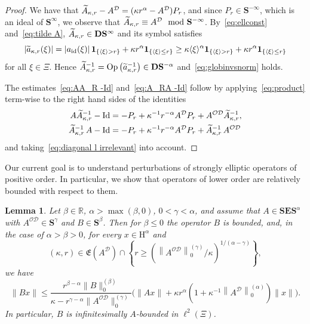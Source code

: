 \documentclass[10pt]{amsart}
\newtheorem{lemm}[theo]{Lemma}\newtheorem{prop}[theo]{Proposition}\newtheorem{coro}[theo]{Corollary}\newtheorem{conj}[theo]{Conjecture}
\theoremstyle{definition}\newtheorem{defi}[theo]{Definition}\newtheorem{rema}[theo]{Remark}\newtheorem{exam}[theo]{Example}\newtheorem{nota}[theo]{Notation}
\DeclareMathOperator{\Op}{Op}
\DeclareMathOperator{\Id}{Id}
\DeclareMathOperator{\id}{id}
\renewcommand{\mathsf}{\mathrm}
\newcommand{\sfH}{\mathsf{H}}
\newcommand{\R}{\mathbb R}
\newcommand{\CD}{\mathcal{D}}
\newcommand{\CO}{\mathcal{O}}
\newcommand{\bone}{\boldsymbol 1}
\newcommand{\BD}{\mathbf D}
\newcommand{\BE}{\mathbf E}
\newcommand{\BS}{\mathbf S}
\newcommand{\FE}{\mathfrak{E}}
\newcommand{\abs}[1]{\left\lvert #1 \right\rvert}
\newcommand{\set}[1]{\left\{ #1 \right\}}
\newcommand{\ang}[1]{\langle #1 \rangle}
\newcommand{\er}{r}
\let\oldtilde\tilde
\renewcommand*{\tilde}[1]{\mathchoice{\widetilde{#1}}{\widetilde{#1}}{\oldtilde{#1}}{\oldtilde{#1}}}
\begin{document}
\begin{proof}
We have that $\tilde A_{\kappa,\er} - A^{\CD} = (\kappa \er^\alpha - A^{\CD}) P_\er$, and since $P_\er \in \BS^{-\infty}$, which is an ideal of $\BS^\infty$, we observe that $\tilde A_{\kappa,\er} \equiv A^{\CD}
\mod{\BS^{-\infty}}$. By~\eqref{eq:ellconst} and~\eqref{eq:tilde A}, $\tilde A_{\kappa,\er}\in\BD\BS^\infty$ and its symbol satisfies
\begin{equation}
\abs{\tilde a_{\kappa, \er}(\xi)} = \abs{a_{\id}(\xi)}\bone_{\set{\ang \xi >\er}} +
\kappa \er^\alpha\bone_{\set{\ang \xi\le\er}} \ge \kappa \ang
\xi^\alpha\bone_{\set{\ang \xi>\er}} + \kappa \er^\alpha\bone_{\set{\ang \xi\le\er}}
\end{equation}
for all $\xi \in \Xi$. Hence $\tilde A_{\kappa,\er}^{-1} =\Op\big(\tilde a_{\kappa,\er}^{-1}\big)\in\BD\BS^{-\alpha}$ and~\eqref{eq:globinvsnorm} holds.

The estimates~\eqref{eq:AA_R -Id} and~\eqref{eq:A_RA -Id} follow by applying~\eqref{eq:product} term-wise to the right hand sides of the identities
\begin{equation*}
\begin{split}
A \tilde A_{\kappa,\er}^{-1} - \Id &= -P_\er +\kappa^{-1}\er^{-\alpha}A^{\CD}P_\er +A^{\CO\CD}\tilde A_{\kappa,\er}^{-1},\\
\tilde A_{\kappa,\er}^{-1}\,A - \Id &= -P_\er +\kappa^{-1}\er^{-\alpha}A^{\CD}P_\er +\tilde A_{\kappa,\er}^{-1}\,A^{\CO\CD}
\end{split}
\end{equation*}
and taking~\eqref{eq:diagonal l irrelevant} into account.
\end{proof}


Our current goal is to understand perturbations of strongly elliptic operators of positive order. In particular, we show that operators of lower order are relatively bounded with respect to them.

\begin{lemm}\label{lem:relative boundedness}
Let $\beta\in\R$, $\alpha>\max(\beta,0)$, $0 <\gamma < \alpha$, and assume that $A \in \BS\BE\BS^\alpha$ with $A^{\CO\CD}\in \BS^\gamma$ and $B \in \BS^\beta$. Then for $\beta\le 0$ the operator $B$ is bounded, and, in the case of $\alpha
>\beta >0$, for every $x\in\sfH^\alpha$ and
\[
(\kappa,
\er)\in\FE\left(A^\CD\right)\cap \left\{\er
\geq\left(\left\|A^{\CO\CD}\right\|_0^{(\gamma)}/\kappa\right)^{1/(\alpha
-\gamma)}\right\},
\]
we have
\begin{equation}\label{eq:infinitesimal estimate}
\|Bx\| \le \frac{\er^{\beta -\alpha}\|B\|_0^{(\beta)}}{\kappa -\er^{\gamma -\alpha}\|A^{\CO\CD}\|_0^{(\gamma)}}\Big(\|Ax\| +\kappa \er^{\alpha}\left(1 +\kappa^{-1}\left\|A^\CD\right\|_0^{(\alpha)}\right)\|x\|\Big).
\end{equation}
In particular, $B$ is infinitesimally $A$-bounded in $\ell^2(\Xi)$.
\end{lemm}
\end{document}
